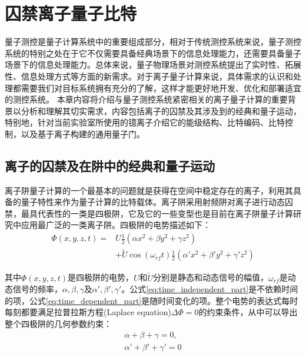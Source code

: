 
\chapter[囚禁离子量子比特]{囚禁离子量子比特\label{section:quantum_computation}}
量子测控是量子计算系统中的重要组成部分，相对于传统测控系统来说，量子测控系统的特别之处在于它不仅需要具备经典场景下的信息处理能力，还需要具备量子场景下的信息处理能力。总体来说，量子物理场景对测控系统提出了实时性、拓展性、信息处理方式等方面的新需求。对于离子量子计算来说，具体需求的认识和处理都需要我们对目标系统拥有充分的了解，这样才能更好地开发、优化和部署适宜的测控系统。
本章内容将介绍与量子测控系统紧密相关的离子量子计算的重要背景以分析和理解其切实需求，内容包括离子的囚禁及其涉及到的经典和量子运动，特别地，针对当前实验室所使用的镱离子介绍它的能级结构、比特编码、比特控制，以及基于离子构建的通用量子门。


\section[离子的囚禁及在阱中的经典和量子运动]{离子的囚禁及在阱中的经典和量子运动\label{section:ion_trap_motion}}
离子阱量子计算的一个最基本的问题就是获得在空间中稳定存在的离子，利用其具备的量子特性来作为量子计算的比特载体。离子阱采用射频阱对离子进行动态囚禁，最具代表性的一类是四极阱，它及它的一些变型也是目前在离子阱量子计算研究中应用最广泛的一类离子阱。四极阱的电势描述如下：
\begin{align}
    \Phi(x, y, z, t) = &U\frac{1}{2}(\alpha x^2 + \beta y^2 + \gamma z^2) \label{eq:time_independent_part}\\
    \label{eq:time_dependent_part}
    &+ \tilde{U}\cos (\omega_{rf}t)\frac{1}{2}(\alpha ' x^2 + \beta ' y^2 + \gamma ' z^2) 
\end{align}

其中$\Phi(x, y, z, t)$是四极阱的电势，$U$和$\tilde{U}$分别是静态和动态信号的幅值，$\omega_{rf}$是动态信号的频率，$\alpha, \beta, \gamma$及$\alpha', \beta', \gamma'$。公式\eqref{eq:time_independent_part}是不依赖时间的项，公式\eqref{eq:time_dependent_part}是随时间变化的项。整个电势的表达式每时每刻都要满足拉普拉斯方程(Laplace equation)$\Delta \Phi=0$的约束条件，从中可以导出整个四极阱的几何参数约束：
\begin{align}
    \alpha + \beta + \gamma =0,\\
    \alpha ' + \beta ' + \gamma ' =0
\end{align}


